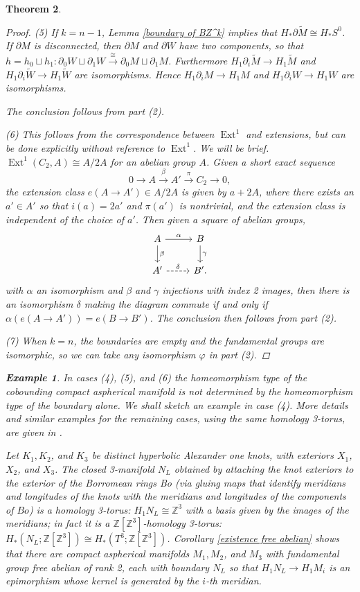 \documentclass[12pt]{amsart}
\newtheorem{theorem}{Theorem}
\theoremstyle{definition}
\newtheorem{example}[theorem]{Example}
\newcommand{\Z}{\mathbb Z}
\DeclareMathOperator{\Ext}{Ext}
\newcommand{\wt}[1]{{\widetilde{#1}}}
\begin{document}
\begin{theorem}
\begin{proof}
\noindent (5)  If $k = n-1$, Lemma \ref{boundary of BZ^k} implies that $H_*\partial \wt M \cong H_*S^0$.  If $\partial M$ is disconnected, then  $\partial M$ and $\partial W$ have two components, so that $h = h_0 \sqcup h_1 : \partial_0 W \sqcup \partial_1 W \xrightarrow{\cong} \partial_0 M \sqcup \partial_1 M$.   Furthermore $H_1\partial_i \wt M \to H_1\wt M$ and $H_1\partial_i \wt W \to H_1\wt W$ are isomorphisms.   Hence $H_1\partial_i M \to H_1M$ and $H_1\partial_i  W \to H_1W$ are isomorphisms. 

 The conclusion follows from part (2).

\noindent (6)
This follows from the correspondence between $\Ext^1$ and extensions, but can be done explicitly without reference to $\Ext^1$.   We will be brief.    $\Ext^1(C_2,A) \cong A/2A$ for an abelian group $A$.  Given a short exact sequence 
$$
0 \to A \xrightarrow{\beta} A' \xrightarrow{\pi} C_2 \to 0,
$$
 the extension class $e(A \to A')  \in A/2A$ is given by $a + 2A$,  where there exists an $a' \in A'$ so that $i(a) = 2a'$ and $\pi(a')$ is nontrivial, and the extension class is independent of the choice of $a'$.     Then given a  square of abelian groups, 
$$
\begin{tikzcd}
A \arrow[r,"\alpha"]  \arrow[d,"\beta"] &  B  \arrow[d,"\gamma"] \\
A' \arrow[r,dashed,"\delta"] &  B'.
\end{tikzcd}
$$
with $\alpha$ an isomorphism and $\beta$ and $\gamma$ injections with index 2 images, then there is an isomorphism $\delta$ making the diagram commute if and only if $\alpha(e(A \to A')) = e(B \to B')$.   The conclusion then follows from part (2).

\noindent (7)    When $k = n$, the boundaries are empty and the fundamental groups are isomorphic, so we can take any isomorphism $\varphi$ in part (2).
\end{proof}


\begin{example} \label{nonhomeomorphic}
In cases (4), (5), and (6) the homeomorphism type of the cobounding compact aspherical manifold is not determined by  the homeomorphism type of  the boundary alone.   We shall sketch an example in case (4).  More details and similar examples for the remaining cases, using the same homology 3-torus, are given in \cite{DH2}.


Let $K_1, K_2$, and  $K_3$ be  distinct hyperbolic Alexander one knots, with exteriors $X_1$, $X_2$, and $X_3$.   The closed 3-manifold $N_L$ obtained by attaching the knot exteriors to the exterior  of the Borromean rings Bo (via gluing maps that identify meridians and longitudes of the knots with the meridians and longitudes of the components of $Bo$) is a homology 3-torus: $H_1N_L \cong \Z^3$ with a basis given by the images of the meridians; in fact it is a $\Z[\Z^3]$-homology 3-torus: $H_*(N_L;\Z[\Z^3]) \cong H_*(T^3;\Z[\Z^3])$.  Corollary \ref{existence free abelian} shows that there are compact aspherical manifolds $M_1, M_2$, and $M_3$ with fundamental group free abelian of rank 2, each with boundary $N_L$ so that $H_1N_L \to H_1M_i$ is an epimorphism whose kernel is generated by the $i$-th meridian.   


\end{example}
\end{theorem}
\end{document}
